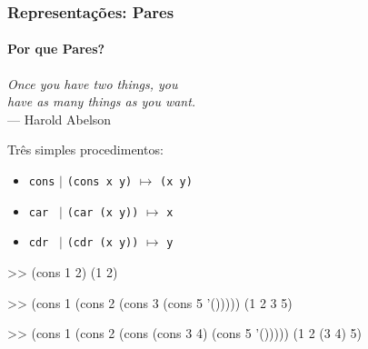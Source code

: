 \begin{frame}
  \frametitle{Representações: Pares}
  \framesubtitle{Por que Pares?}

  \begin{center}
  \textit{Once you have two things, you \\
            have as many things as you want.}\\
      --- Harold Abelson
  \end{center}
  \pause
  \vspace{0.5cm}
  Três simples procedimentos:

  \begin{itemize}
    \item \texttt{cons} \hspace{0.4cm} $\mid$ \hspace{0.4cm} \texttt{(cons x y)} $\mapsto$ \texttt{(x y)} \\
    \item \texttt{car } \hspace{0.4cm} $\mid$ \hspace{0.4cm} \texttt{(car (x y))} $\mapsto$ \texttt{x} \\
    \item \texttt{cdr } \hspace{0.4cm} $\mid$ \hspace{0.4cm} \texttt{(cdr (x y))} $\mapsto$ \texttt{y} \\
  \end{itemize}
\end{frame}



\begin{frame}[fragile]
  \begin{code}

>> (cons 1 2)
(1 2)
  \end{code}
  \pause
  \begin{code}

>> (cons 1 (cons 2 (cons 3 (cons 5 '()))))
(1 2 3 5)
  \end{code}
  \pause
  \begin{code}

>> (cons 1 (cons 2 (cons (cons 3 4) (cons 5 '()))))
(1 2 (3 4) 5)
  \end{code}
\end{frame}